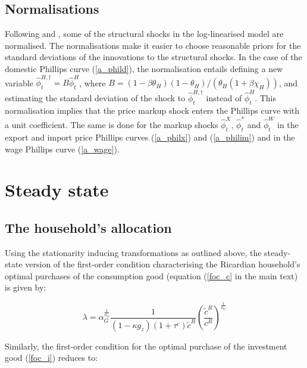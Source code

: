 \documentclass[a4paper,11pt]{article}
\numberwithin{equation}{section}
\begin{document}
	\subsection{Normalisations}
	
	Following \cite{christoffel2008} and \cite{coenen2013}, some of the structural shocks in the log-linearised model are normalised. The normalisations make it easier to choose reasonable priors for the standard deviations of the innovations to the structural shocks.	In the case of the domestic Phillips curve	(\ref{a_phild}), the normalisation entails defining a new variable $\hat{\phi}_t^{H,\dagger}=B\hat{\phi}_t^H$, where $B=\left(1-\beta\theta_H\right)\left(1-\theta_H\right)/\left(\theta_H\left(1+\beta\chi_H\right)\right)$, and estimating the standard deviation of the shock to $\hat{\phi}_t^{H,\dagger}$ instead of $\hat{\phi}_t^H$. This normalisation implies that the price markup shock enters the Phillips curve with a unit coefficient. The same is done for the markup shocks $\hat{\phi}_t^X$, $\hat{\phi}_t^*$ and $\hat{\phi}_t^W$ in the export and import price Phillips curves (\ref{a_philx}) and (\ref{a_philim}) and in the wage Phillips curve (\ref{a_wage}). 
	

	
	\section{Steady state}
	
	\subsection{The household's allocation}
	
	Using the stationarity inducing transformations as outlined above, the steady-state version of the first-order condition characterising the Ricardian household's optimal purchases of the consumption good (equation (\ref{foc_c} in the main text) is given by:
	
	\begin{equation} \label{b1}
	\lambda=\alpha_G^{\frac{1}{\nu_G}}\frac{1}{\left(1-\kappa g_z\right)\left(1+\tau^c\right)\tilde{c}^R}\left(\frac{\tilde{c}^R}{c^R}\right)^{\frac{1}{\nu_G}}
	\end{equation}
	
	Similarly, the first-order condition for the optimal purchase of the investment good (\ref{foc_i}) reduces to:
	
\end{document}
